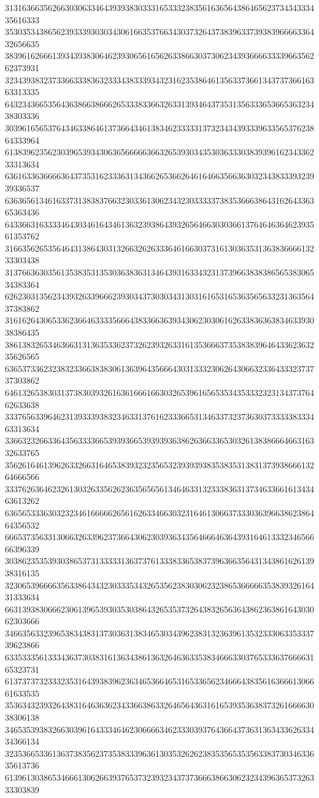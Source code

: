 31316366356266303063346439393830333165333238356163656438646562373434333435616333
35303534386562393339303034306166353766343037326437383963373938396666336432656635
38396162666139343938306462393065616562633866303730623439366663333966356262373931
32343938323733663338363233343833393432316235386461356337366134373736616363313335
64323436653564363866386662653338336632633139346437353135633365366536323438303336
30396165653764346338646137366434613834623333313732343439333963356537623864333964
61383962356230396539343063656666636632653930343530363330383939616234336233313634
63616336366663643735316233363134366265366264616466356636303234383339323939336537
63636561346163373138383766323033613062343230333337383536663864316264336365363436
64336631633334643034616434613632393864393265646630303661376464636462393561353762
31663562653564643138643031326632626333646166303731613036353136383666613233303438
31376636303561353835313530363836313464393163343231373966383838656538306534383364
62623031356234393263396662393034373030343130316165316536356563323136356437383862
31616264306533623664633335666438336636393430623030616263383636383463393038386435
38613832653463663131363533623732623932633161353666373538383964643362363235626565
63653733623238323366383830613639643566643031333230626430663233643332373737303862
64613265383031373830393261636166616630326539616565353435333232313437376462633638
33376563396462313933393832346331376162333665313463373237363037333338333463313634
33663232663364356333366539393665393939363862636633653032613838666466316332633765
35626164613962633266316465383932323565323939393835383531383137393866613264666566
33376263646232613032633562623635656561346463313233383631373463366161343463613262
63656533363032323461666662656162633466303231646130663733303639663862386464356532
66653735633130663263396237366430623039363435646664636439316461333234656666396339
30386235353930386537313333313637376133383365383739636635643134386162613938316135
32306539666635633864343230333534326535623830306232386536666635383932616431333634
66313938306662306139653930353038643265353732643832656364386236386164303062303666
34663563323965383438313730363138346530343962383132363961353233306335333739623866
63353335613334363730383161363438613632646363353834666330376533363766663165323731
61373737323332353164393839623634653664653165336562346664383561636661306661633535
35363432393264383164636362343366386332646564363161653935363837326166663038306138
34653539383266303961643334646230666634623330393764366437363136343362633434366134
32353665336136373835623735383339636130353262623835356535356338373034633635613736
61396130386534666130626639376537323932343737366638663062323439636537326333303839
